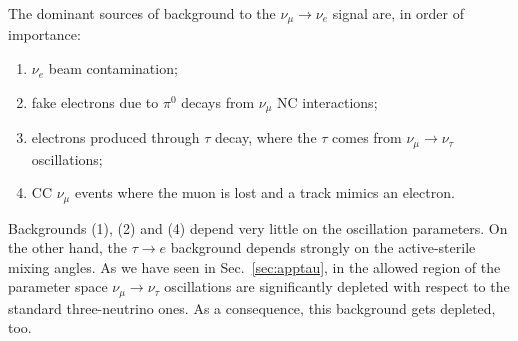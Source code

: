 \documentclass[12pt]{elsart}
\begin{document}
The dominant sources of background to the $\nu_\mu \to \nu_e$ signal
are, in order of importance:
%
\begin{enumerate}
  \item $\nu_e$ beam contamination;
    
  \item fake electrons due to $\pi^0$ decays from $\nu_\mu$ NC
    interactions;
    
  \item electrons produced through $\tau$ decay, where the $\tau$
    comes from $\nu_\mu \to \nu_\tau$ oscillations;

  \item CC $\nu_\mu$ events where the muon is lost and a track mimics
    an electron.
\end{enumerate}

Backgrounds (1), (2) and (4) depend very little on the oscillation
parameters. On the other hand, the $\tau \to e$ background depends
strongly on the active-sterile mixing angles. As we have seen in
Sec.~\ref{sec:apptau}, in the allowed region of the parameter space
$\nu_\mu \to \nu_\tau$ oscillations are significantly depleted with
respect to the standard three-neutrino ones. As a consequence, this
background gets depleted, too. 
\end{document}
